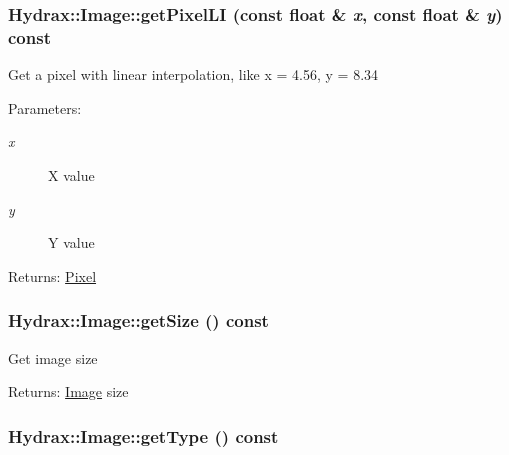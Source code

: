 \begin{CompactItemize}
{\subsubsection[{getPixelLI}]{ Hydrax::Image::getPixelLI (const float \& {\em x}, \/  const float \& {\em y}) const}}
\label{class_hydrax_1_1_image_433e71c1e9630bbaddbcef5795f50bfa}


Get a pixel with linear interpolation, like x = 4.56, y = 8.34 \begin{Desc}
\item[Parameters:]
\begin{description}
\item[{\em x}]X value \item[{\em y}]Y value \end{description}
\end{Desc}
\begin{Desc}
\item[Returns:]\hyperlink{struct_hydrax_1_1_image_1_1_pixel}{Pixel} \end{Desc}
\hypertarget{class_hydrax_1_1_image_06a882ca6cfb5f4c65d64b820e55c384}{
\subsubsection[{getSize}]{ Hydrax::Image::getSize () const}}
\label{class_hydrax_1_1_image_06a882ca6cfb5f4c65d64b820e55c384}


Get image size \begin{Desc}
\item[Returns:]\hyperlink{class_hydrax_1_1_image}{Image} size \end{Desc}
\hypertarget{class_hydrax_1_1_image_b39de4a80c2c0bf18c7128a8de80c048}{
\subsubsection[{getType}]{ Hydrax::Image::getType () const}}
\label{class_hydrax_1_1_image_b39de4a80c2c0bf18c7128a8de80c048}



\end{CompactItemize}

